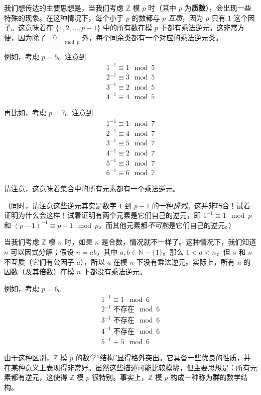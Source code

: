 我们想传达的主要思想是，当我们考虑 $\mathbb{Z}$ 模 $p$ 时（其中 $p$ 为\textbf{质数}），会出现一些特殊的现象。在这种情况下，每个小于 $p$ 的数都与 $p$ \emph{互质}，因为 $p$ 只有 $1$ 这个因子。这意味着在 $\{1, 2, \dots, p-1\}$ 中的所有数在模 $p$ 下都有乘法逆元。这非常方便，因为除了 $[0]_{\mod p}$ 外，每个同余类都有一个对应的乘法逆元类。

例如，考虑 $p=5$。注意到
\begin{align*}
    1^{-1} \equiv 1 \mod 5\\
    2^{-1} \equiv 3 \mod 5\\
    3^{-1} \equiv 2 \mod 5\\
    4^{-1} \equiv 4 \mod 5
\end{align*}

再比如，考虑 $p=7$。注意到
\begin{align*}
    1^{-1} \equiv 1 \mod 7\\
    2^{-1} \equiv 4 \mod 7\\
    3^{-1} \equiv 5 \mod 7\\
    4^{-1} \equiv 2 \mod 7\\
    5^{-1} \equiv 3 \mod 7\\
    6^{-1} \equiv 6 \mod 7
\end{align*}

请注意，这意味着集合中的所有元素都有一个乘法逆元。

（同时，请注意这些逆元其实是数字 $1$ 到 $p - 1$ 的一种\emph{排列}。这并非巧合！试着证明为什么会这样！试着证明有两个元素是它们自己的逆元，即 $1^{-1} \equiv 1 \mod p$ 和 $(p - 1)^{-1} \equiv p - 1 \mod p$，而其他元素都\emph{不可能}是它们自己的逆元。）

当我们考虑 $\mathbb{Z}$ 模 $n$ 时，如果 $n$ 是合数，情况就不一样了。这种情况下，我们知道 $n$ 可以因式分解；假设 $n = ab$，其中 $a,b \in \mathbb{N}-\{1\}$。那么 $1 < a < n$，但 $a$ 和 $n$ 不互质（它们有公因子 $a$），所以 $a$ 在模 $n$ 下没有乘法逆元。实际上，所有 $n$ 的因数（及其倍数）在模 $n$ 下都没有乘法逆元。

例如，考虑 $p=6$。
\begin{align*}
    1^{-1} \equiv 1 \mod 6\\
    2^{-1} \;\text{不存在} \mod 6\\
    3^{-1} \;\text{不存在} \mod 6\\
    4^{-1} \;\text{不存在} \mod 6\\
    5^{-1} \equiv 5 \mod 6
\end{align*}

由于这种区别，$\mathbb{Z}$ 模 $p$ 的数学``结构''显得格外突出。它具备一些优良的性质，并在某种意义上表现得非常好。虽然这些描述可能比较模糊，但主要思想是：所有元素都有逆元，这使得 $\mathbb{Z}$ 模 $p$ 很特别。事实上，$\mathbb{Z}$ 模 $p$ 构成一种称为\textbf{群}的数学结构。

